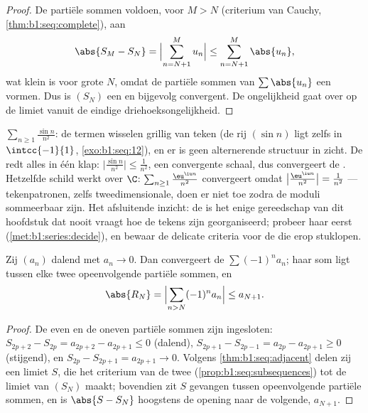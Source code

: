 \begin{proof}
De partiële sommen voldoen, voor $M > N$ (criterium van Cauchy,
\cref{thm:b1:seq:complete}), aan
\[
\abs{S_M - S_N} = \Bigl| \sum_{n=N+1}^{M} u_n \Bigr|
\leq \sum_{n=N+1}^{M} \abs{u_n},
\]
wat klein is voor grote $N$, omdat de partiële sommen van
$\sum\abs{u_n}$ een  vormen. Dus is $(S_N)$ een 
en bijgevolg convergent. De ongelijkheid gaat over op de limiet
vanuit de eindige driehoeksongelijkheid.
\end{proof}

\begin{example}\label{ex:b1:series:absexamples}
$\sum_{n\geq1} \frac{\sin n}{n^2}$: de termen wisselen grillig
van teken (de rij $(\sin n)$ ligt zelfs  in
$\intcc{-1}{1}$, \cref{exo:b1:seq:12}), en er is geen
alternerende structuur in zicht. De  redt
alles in één klap: $\bigl|\frac{\sin n}{n^2}\bigr| \leq
\frac{1}{n^2}$, een convergente schaal, dus convergeert de .
Hetzelfde schild werkt over $\C$: $\sum_{n\geq1}\frac{\eu^{\iu
n}}{n^2}$ convergeert omdat $\bigl|\frac{\eu^{\iu n}}{n^2}\bigr|
= \frac{1}{n^2}$ --- tekenpatronen, zelfs tweedimensionale, doen
er niet toe zodra de moduli sommeerbaar zijn. Het afsluitende
inzicht: de  is het enige gereedschap van
dit hoofdstuk dat nooit vraagt hoe de tekens zijn georganiseerd;
probeer haar eerst (\cref{met:b1:series:decide}), en bewaar de
delicate criteria voor de  die erop stuklopen.
\end{example}

\begin{theorem}\label{thm:b1:series:alternating}
Zij $(a_n)$ dalend met $a_n \to 0$. Dan convergeert de  $\sum (-1)^n a_n$; haar som ligt tussen elke twee
opeenvolgende partiële sommen, en
\[
\abs{R_N} = \Bigl| \sum_{n > N} (-1)^n a_n \Bigr| \leq a_{N+1} .
\]
\end{theorem}

\begin{proof}
De even en de oneven partiële sommen zijn ingesloten: $S_{2p+2} -
S_{2p} = a_{2p+2} - a_{2p+1} \leq 0$ (dalend), $S_{2p+1} - S_{2p-1}
= a_{2p} - a_{2p+1} \geq 0$ (stijgend), en $S_{2p} - S_{2p+1} =
a_{2p+1} \to 0$. Volgens \cref{thm:b1:seq:adjacent} delen zij een
limiet $S$, die het criterium van de twee 
(\cref{prop:b1:seq:subsequences}) tot de limiet van $(S_N)$ maakt;
bovendien zit $S$ gevangen tussen opeenvolgende partiële sommen, en
is $\abs{S - S_N}$ hoogstens de opening naar de volgende, $a_{N+1}$.
\end{proof}

